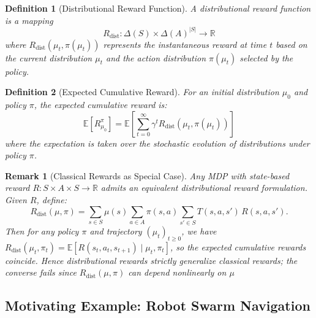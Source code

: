 \documentclass{article}
\newtheorem{definition}{Definition}
\newtheorem{remark}{Remark}
\begin{document}
\begin{definition}[Distributional Reward Function]
A distributional reward function is a mapping 
\[
R_{\text{dist}}: \Delta(S) \times \Delta(A)^{|S|} \to \mathbb{R}
\]
where $R_{\text{dist}}(\mu_t, \pi(\mu_t))$ represents the instantaneous reward at time $t$ based on the current distribution $\mu_t$ and the action distribution $\pi(\mu_t)$ selected by the policy.
\end{definition}

\begin{definition}[Expected Cumulative Reward]
For an initial distribution $\mu_0$ and policy $\pi$, the expected cumulative reward is:
\[
\mathbb{E}[R_{\mu_0}^{\pi}] = \mathbb{E}\left[\sum_{t=0}^{\infty} \gamma^t R_{\text{dist}}(\mu_t, \pi(\mu_t))\right]
\]
where the expectation is taken over the stochastic evolution of distributions under policy $\pi$.
\end{definition}

\begin{remark}[Classical Rewards as Special Case]
Any MDP with state-based reward $R: S \times A \times S \to \mathbb{R}$ admits an equivalent distributional reward formulation. Given $R$, define:
\[
R_{\text{dist}}(\mu, \pi) = \sum_{s \in S} \mu(s) \sum_{a \in A} \pi(s,a) \sum_{s' \in S} T(s,a,s')\, R(s,a,s').
\]
Then for any policy $\pi$ and trajectory $(\mu_t)_{t \geq 0}$, we have $R_{\text{dist}}(\mu_t, \pi_t) = \mathbb{E}[R(s_t, a_t, s_{t+1}) \mid \mu_t, \pi_t]$, so the expected cumulative rewards coincide. Hence distributional rewards strictly generalize classical rewards; the converse fails since $R_{\text{dist}}(\mu, \pi)$ can depend nonlinearly on $\mu$ 
\end{remark}

\subsection{Motivating Example: Robot Swarm Navigation}
\end{document}
